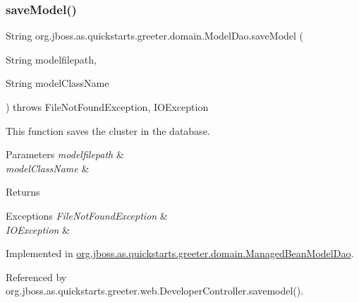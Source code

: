 \subsubsection{\texorpdfstring{save\+Model()}{saveModel()}}
{\footnotesize\ttfamily String org.\+jboss.\+as.\+quickstarts.\+greeter.\+domain.\+Model\+Dao.\+save\+Model (\begin{DoxyParamCaption}\item[{String}]{modelfilepath,  }\item[{String}]{model\+Class\+Name }\end{DoxyParamCaption}) throws File\+Not\+Found\+Exception, I\+O\+Exception}



This function saves the cluster in the database. 


\begin{DoxyParams}{Parameters}
{\em modelfilepath} & \\
\hline
{\em model\+Class\+Name} & \\
\hline
\end{DoxyParams}
\begin{DoxyReturn}{Returns}

\end{DoxyReturn}

\begin{DoxyExceptions}{Exceptions}
{\em File\+Not\+Found\+Exception} & \\
\hline
{\em I\+O\+Exception} & \\
\hline
\end{DoxyExceptions}


Implemented in \hyperlink{classorg_1_1jboss_1_1as_1_1quickstarts_1_1greeter_1_1domain_1_1_managed_bean_model_dao_a5be76afee3c059eafe8e617578bc1f26}{org.\+jboss.\+as.\+quickstarts.\+greeter.\+domain.\+Managed\+Bean\+Model\+Dao}.



Referenced by org.\+jboss.\+as.\+quickstarts.\+greeter.\+web.\+Developer\+Controller.\+savemodel().

\mbox{\label{interfaceorg_1_1jboss_1_1as_1_1quickstarts_1_1greeter_1_1domain_1_1_model_dao_aef8db8a9057a95cc0a3bb027843b609d}} 
